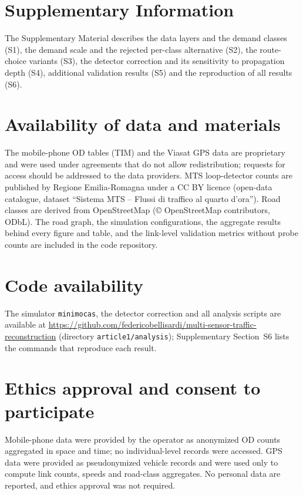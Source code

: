 \documentclass[pdflatex,Numbered]{sn-jnl}
\begin{document}
\section*{Supplementary Information}

The Supplementary Material describes the data layers and the demand classes (S1), the demand scale and the rejected per-class alternative (S2), the route-choice variants (S3), the detector correction and its sensitivity to propagation depth (S4), additional validation results (S5) and the reproduction of all results (S6).

\section*{Availability of data and materials}

The mobile-phone OD tables (TIM) and the Viasat GPS data are proprietary and were used under agreements that do not allow redistribution; requests for access should be addressed to the data providers. MTS loop-detector counts are published by Regione Emilia-Romagna under a CC BY licence (open-data catalogue, dataset ``Sistema MTS -- Flussi di traffico al quarto d'ora''). Road classes are derived from OpenStreetMap (\copyright{} OpenStreetMap contributors, ODbL). The road graph, the simulation configurations, the aggregate results behind every figure and table, and the link-level validation metrics without probe counts are included in the code repository.

\section*{Code availability}

The simulator \texttt{minimocas}, the detector correction and all analysis scripts are available at \url{https://github.com/federicobellisardi/multi-sensor-traffic-reconstruction} (directory \texttt{article1/analysis}); Supplementary Section~S6 lists the commands that reproduce each result.

\section*{Ethics approval and consent to participate}

Mobile-phone data were provided by the operator as anonymized OD counts aggregated in space and time; no individual-level records were accessed. GPS data were provided as pseudonymized vehicle records and were used only to compute link counts, speeds and road-class aggregates. No personal data are reported, and ethics approval was not required.
\end{document}
